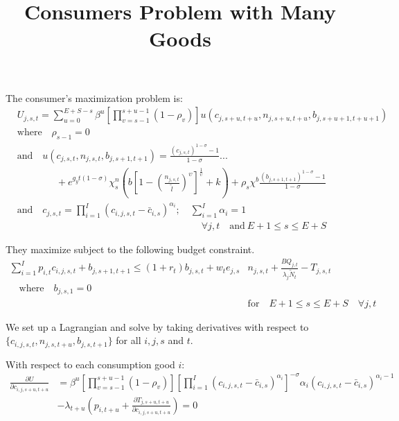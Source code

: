 \documentclass[letterpaper,11pt]{article}
\theoremstyle{definition}
\begin{document}
\title{Consumers Problem with Many Goods}
\maketitle
The consumer's maximization problem is:
\begin{equation}\label{EqUtilMax}
  \begin{split}
    &U_{j,s,t} = \sum_{u=0}^{E+S-s}\beta^u\left[\prod_{v=s-1}^{s+u-1}(1-\rho_v)\right] u\left(c_{j,s+u,t+u},n_{j,s+u,t+u},b_{j,s+u+1,t+u+1}\right) \\
    &\text{where}\quad \rho_{s-1}=0 \\
    &\text{and} \quad u\left(c_{j,s,t},n_{j,s,t},b_{j,s+1,t+1}\right) = \frac{\left(c_{j,s,t}\right)^{1-\sigma} - 1}{1-\sigma} ... \\
    &\qquad\qquad + e^{g_y t(1-\sigma)}\chi^n_s\left(b\left[1 - \left(\frac{n_{j,s,t}}{\tilde{l}}\right)^\upsilon\right]^\frac{1}{\upsilon} + k\right) + \rho_s\chi^b\frac{\left(b_{j,s+1,t+1}\right)^{1-\sigma} - 1}{1-\sigma} \\
    &\text{and} \quad c_{j,s,t} = \prod_{i=1}^I \left( c_{i,j,s,t} - \bar c_{i,s} \right) ^{\alpha_i}; \quad \sum_{i=1}^I \alpha_i = 1 \\
    &\quad\quad\quad\quad\quad\quad\quad\quad\quad\quad\quad\quad\quad\quad\quad\quad\quad\quad\quad\forall j,t\quad\text{and}\:E+1\leq s\leq E+S
  \end{split}
\end{equation}

They maximize subject to the following budget constraint.
\begin{equation}\label{EqBC}
  \begin{split}
    \sum_{i=1}^I p_{i,t}c_{i,j,s,t} + b_{j,s+1,t+1} \leq \left(1 + r_t\right) b_{j,s,t} + w_t e_{j,s}&n_{j,s,t} + \frac{BQ_{j,t}}{\lambda_j\tilde{N}_t} - T_{j,s,t} \\
    \quad\text{where}\quad b_{j,s,1} = 0 \\
    &\text{for} \quad E+1\leq s \leq E+S \quad \forall j,t
  \end{split}
\end{equation}

We set up a Lagrangian and solve by taking derivatives with respect to $\{c_{i,j,s,t},n_{j,s,t+u},b_{j,s,t+1}\}$ for all $i,j,s$ and $t$.

With respect to each consumption good $i$:
\begin{equation}\label{Eqcfoc}
  \begin{split}
  \frac{\partial U}{\partial c_{i,j,s+u,t+u}} & = \beta^u\left[\prod_{v=s-1}^{s+u-1}(1-\rho_v)\right] \left[ \prod_{i=1}^I \left( c_{i,j,s,t} - \bar c_{i,s} \right) ^{\alpha_i} \right]^{-\sigma}\alpha_i \left( c_{i,j,s,t} - \bar c_{i,s} \right)^{\alpha_i-1} \\
   & - \lambda_{t+u} \left( p_{i,t+u} + \frac{\partial T_{j,s+u,t+u}}{\partial c_{i,j,s+u,t+u}} \right)= 0
    \end{split}
\end{equation}
\end{document}
